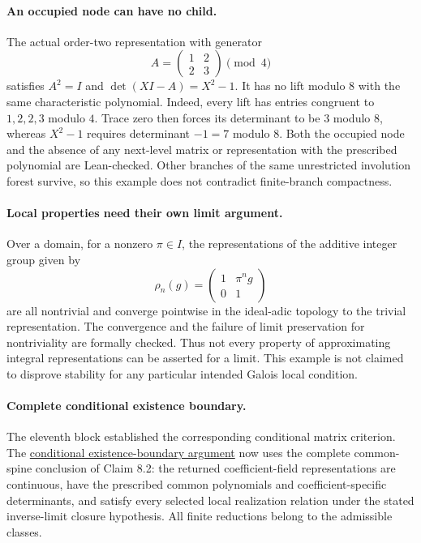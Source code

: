 \documentclass[11pt]{article}
\theoremstyle{definition}
\theoremstyle{remark}
\begin{document}
\paragraph{An occupied node can have no child.}
The actual order-two representation with generator
\[
 A=\begin{pmatrix}1&2\\2&3\end{pmatrix}\pmod4
\]
satisfies $A^2=I$ and $\det(XI-A)=X^2-1$. It has no lift modulo $8$ with
the same characteristic polynomial. Indeed, every lift has entries congruent
to $1,2,2,3$ modulo $4$. Trace zero then forces its determinant to be $3$
modulo $8$, whereas $X^2-1$ requires determinant $-1=7$ modulo $8$.
Both the occupied node and the absence of any next-level matrix or representation
with the prescribed polynomial are Lean-checked. Other branches of the same
unrestricted involution forest survive, so this example does not contradict
finite-branch compactness.

\paragraph{Local properties need their own limit argument.}
Over a domain, for a nonzero $\pi\in I$, the representations of the additive
integer group given by
\[
 \rho_n(g)=\begin{pmatrix}1&\pi^n g\\0&1\end{pmatrix}
\]
are all nontrivial and converge pointwise in the ideal-adic topology to the
trivial representation. The convergence and the failure of limit preservation
for nontriviality are formally checked. Thus not every property of approximating
integral representations can be asserted for a limit. This example is not
claimed to disprove stability for any particular intended Galois local condition.

\paragraph{Complete conditional existence boundary.}\label{book:x-construction-24}
The eleventh block established the corresponding conditional matrix criterion.
The \hyperref[book:x-construction-24]{conditional existence-boundary argument} now uses the complete common-spine conclusion of Claim 8.2: the returned
coefficient-field representations are continuous, have the prescribed common
polynomials and coefficient-specific determinants, and satisfy every selected
local realization relation under the stated inverse-limit closure hypothesis.
All finite reductions belong to the admissible classes.
\end{document}
